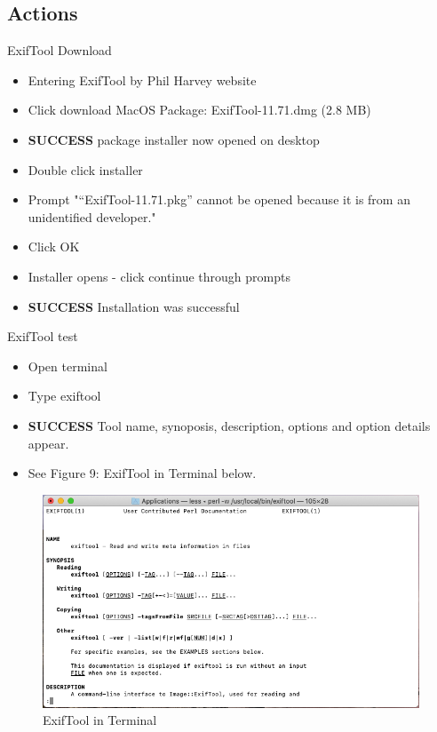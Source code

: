 \documentclass{article}
\begin{document}
\subsection{Actions}
ExifTool Download
\begin{itemize}
\item Entering ExifTool by Phil Harvey website
\item Click download MacOS Package: ExifTool-11.71.dmg (2.8 MB)
\item \textbf{SUCCESS} package installer now opened on desktop
\item Double click installer
\item Prompt "“ExifTool-11.71.pkg” cannot be opened because it is from an unidentified developer."
\item Click OK
\item Installer opens - click continue through prompts
\item \textbf{SUCCESS} Installation was successful
\end{itemize}
ExifTool test
\begin{itemize}
\item Open terminal
\item Type exiftool
\item \textbf{SUCCESS} Tool name, synoposis, description, options and option details appear. 
\item See Figure 9: ExifTool in Terminal below.
\end{itemize}

\begin{figure}[H]
    \centering
    \includegraphics[width=\textwidth]{Images/ExifTool_1.png}
    \caption{ExifTool in Terminal}
    \label{fig:my_label}
\end{figure}
\end{document}

